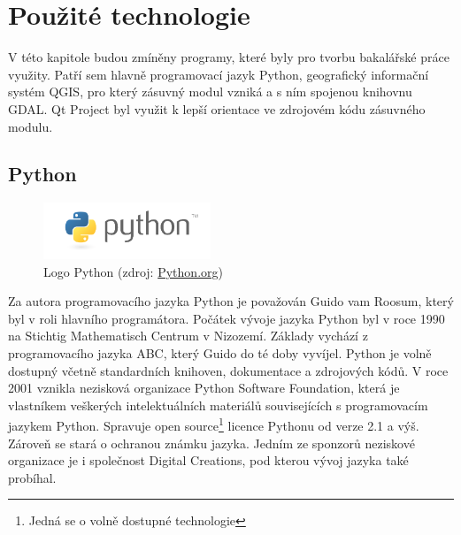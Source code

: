 \chapter{Použité technologie}
\label{3-technologie}
V této kapitole budou zmíněny programy, které byly pro tvorbu
bakalářské práce využity. Patří sem hlavně programovací jazyk Python,
geografický informační systém QGIS, pro který zásuvný modul vzniká a s
ním spojenou knihovnu GDAL. Qt Project byl využit k lepší orientace ve
zdrojovém kódu zásuvného modulu.

\section{Python}
\label{sec:python}
\begin{figure}[H]
	 \centering
      \includegraphics[width=5cm]{./pictures/python-logo.png}
      \caption{Logo Python (zdroj:
\href{https://www.python.org/static/community_logos/python-logo-master-v3-TM.png}{Python.org})}
      \label{fig:python}
  \end{figure}

Za autora programovacího jazyka Python je považován Guido vam Roosum,
který byl v roli hlavního programátora. Počátek vývoje jazyka Python
byl v roce 1990 na Stichtig Mathematisch Centrum v Nizozemí. Základy
vychází z programovacího jazyka ABC, který Guido do té doby
vyvíjel. Python je volně dostupný včetně standardních knihoven,
dokumentace a zdrojových kódů. V roce 2001 vznikla nezisková
organizace Python Software Foundation, která je vlastníkem veškerých
intelektuálních materiálů souvisejících s programovacím jazykem
Python. Spravuje open source\footnote{Jedná se o volně dostupné
  technologie} licence Pythonu od verze 2.1 a výš. Zároveň se stará o
ochranou známku jazyka. Jedním ze sponzorů neziskové organizace je i
společnost Digital Creations, pod kterou vývoj jazyka také probíhal.

